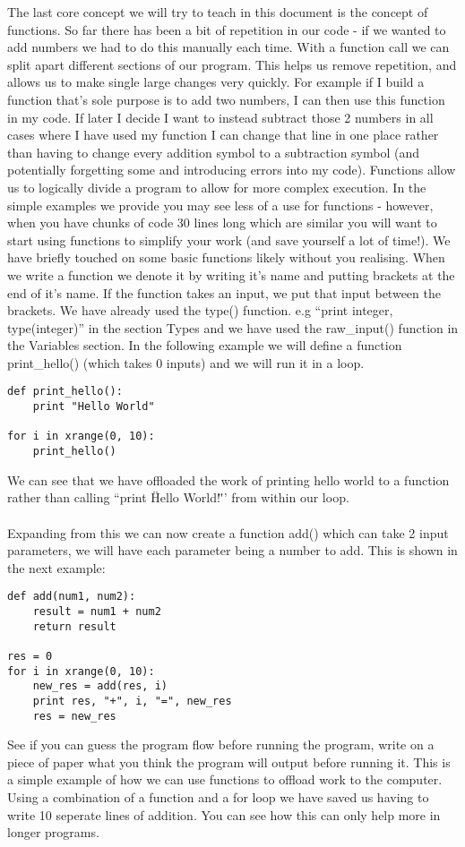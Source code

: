 \documentclass[twocolumn]{article}
\begin{document}
The last core concept we will try to teach in this document is the concept of functions. So far there has been a bit of repetition in our code - if we wanted to add numbers we had to do this manually each time. With a function call we can split apart different sections of our program. This helps us remove repetition, and allows us to make single large changes very quickly. For example if I build a function that's sole purpose is to add two numbers, I can then use this function in my code. If later I decide I want to instead subtract those 2 numbers in all cases where I have used my function I can change that line in one place rather than having to change every addition symbol to a subtraction symbol (and potentially forgetting some and introducing errors into my code). Functions allow us to logically divide a program to allow for more complex execution. In the simple examples we provide you may see less of a use for functions - however, when you have chunks of code 30 lines long which are similar you will want to start using functions to simplify your work (and save yourself a lot of time!). We have briefly touched on some basic functions likely without you realising. When we write a function we denote it by writing it's name and putting brackets at the end of it's name. If the function takes an input, we put that input between the brackets. We have already used the type() function. e.g ``print integer, type(integer)'' in the section Types and we have used the raw\_input() function in the Variables section. In the following example we will define a function print\_hello() (which takes 0 inputs) and we will run it in a loop.
\begin{lstlisting}
def print_hello():
	print "Hello World"

for i in xrange(0, 10):
	print_hello()
\end{lstlisting}
We can see that we have offloaded the work of printing hello world to a function rather than calling ``print \"Hello World!\"'' from within our loop.\\
\\
Expanding from this we can now create a function add() which can take 2 input parameters, we will have each parameter being a number to add. This is shown in the next example:
\begin{lstlisting}
def add(num1, num2):
	result = num1 + num2
	return result

res = 0
for i in xrange(0, 10):
	new_res = add(res, i)
	print res, "+", i, "=", new_res
	res = new_res
\end{lstlisting}
See if you can guess the program flow before running the program, write on a piece of paper what you think the program will output before running it. This is a simple example of how we can use functions to offload work to the computer. Using a combination of a function and a for loop we have saved us having to write 10 seperate lines of addition. You can see how this can only help more in longer programs.
\end{document}

